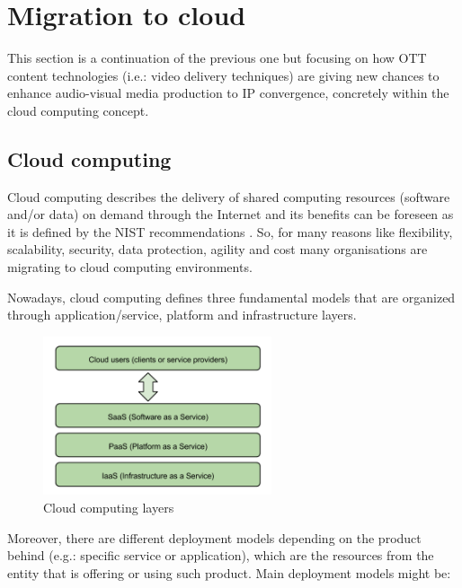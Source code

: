 \section{Migration to cloud}

This section is a continuation of the previous one but focusing on how OTT \cite{ottVSiptv} content technologies (i.e.: video delivery techniques) are giving new chances to enhance audio-visual media production to IP convergence, concretely within the cloud computing concept. 

\subsection{Cloud computing}

Cloud computing describes the delivery of shared computing resources (software and/or data) on demand through the Internet and its benefits can be foreseen as it is defined by the NIST recommendations \cite{nistcc}. So, for many reasons like flexibility, scalability, security, data protection, agility and cost many organisations are migrating to cloud computing environments. 

Nowadays, cloud computing defines three fundamental models that are organized through application/service, platform and infrastructure layers.

\begin{figure}[htb]
\begin{center}
\includegraphics[width=0.6\textwidth]{./images/Cloud_computing_layers.png}
\caption{Cloud computing layers}
\label{F:cloudComputingLayers}
\end{center}
\end{figure}

Moreover, there are different deployment models depending on the product behind (e.g.: specific service or application), which are the resources from the entity that is offering or using such product. Main deployment models might be:

